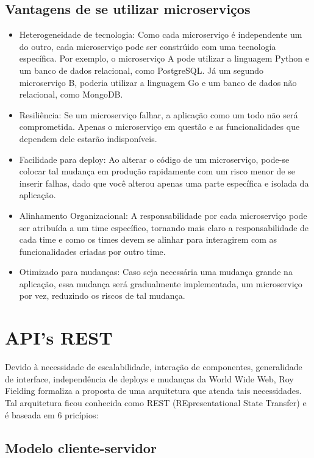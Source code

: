 \subsection{Vantagens de se utilizar microserviços}

\begin{itemize}
\item Heterogeneidade de tecnologia: Como cada microserviço é independente um do outro, cada microserviço pode ser constrúido com uma tecnologia específica. Por exemplo, o microserviço A pode utilizar a linguagem Python e um banco de dados relacional, como PostgreSQL. Já um segundo microserviço B, poderia utilizar a linguagem Go e um banco de dados não relacional, como MongoDB.
\item Resiliência: Se um microserviço falhar, a aplicação como um todo não será comprometida. Apenas o microserviço em questão e as funcionalidades que dependem dele estarão indisponíveis.
\item Facilidade para deploy: Ao alterar o código de um microserviço, pode-se colocar tal mudança em produção rapidamente com um risco menor de se inserir falhas, dado que você alterou apenas uma parte específica e isolada da aplicação.
\item Alinhamento Organizacional: A responsabilidade por cada microserviço pode ser atribuída a um time específico, tornando mais claro a responsabilidade de cada time e como os times devem se alinhar para interagirem com as funcionalidades criadas por outro time.
\item Otimizado para mudanças: Caso seja necessária uma mudança grande na aplicação, essa mudança será gradualmente implementada, um microserviço por vez, reduzindo os riscos de tal mudança.
\end{itemize}

\section{API's REST}

Devido à necessidade de escalabilidade, interação de componentes, generalidade de interface, independência de deploys e mudanças da World Wide Web, Roy Fielding formaliza \cite{royrest} a proposta de uma arquitetura que atenda tais necessidades. Tal arquitetura ficou conhecida como REST (REpresentational State Transfer) e é baseada em 6 pricípios:

\subsection{Modelo cliente-servidor}

